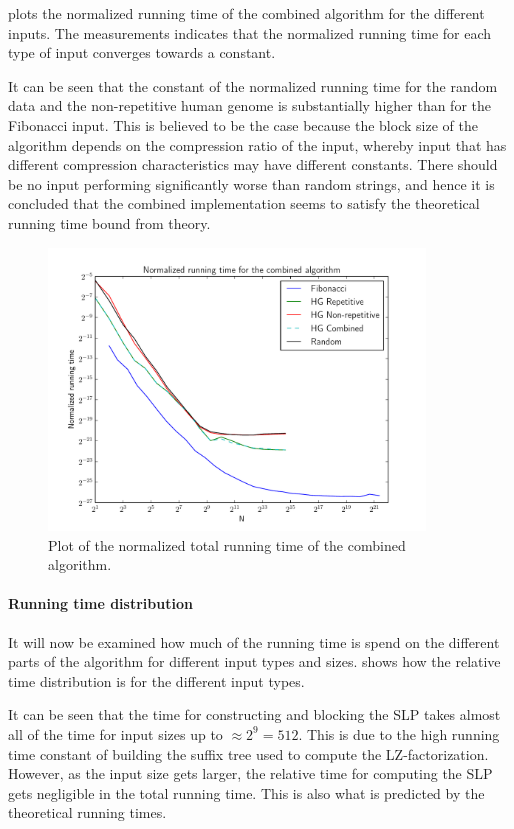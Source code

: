 \documentclass[twoside,11pt,openright]{report}
\begin{document}
 plots the normalized running time of the combined algorithm for the different inputs. The measurements indicates that the normalized running time for each type of input converges towards a constant.

It can be seen that the constant of the normalized running time for the random data and the non-repetitive human genome is substantially higher than for the Fibonacci input. This is believed to be the case because the block size of the algorithm depends on the compression ratio of the input, whereby input that has different compression characteristics may have different constants. There should be no input performing significantly worse than random strings, and hence it is concluded that the combined implementation seems to satisfy the theoretical running time bound from theory.
\begin{figure}[h!]
  \centering
  \includegraphics[width=10cm]{combined/total_runningtime}
  \caption{Plot of the normalized total running time of the combined algorithm.}
  \label{fig:benchmark:total-time-combined}
\end{figure}

\paragraph{Running time distribution}
It will now be examined how much of the running time is spend on the different parts of the algorithm for different input types and sizes.  shows how the relative time distribution is for the different input types.

It can be seen that the time for constructing and blocking the SLP takes almost all of the time for input sizes up to $\approx 2^9 = 512$. This is due to the high running time constant of building the suffix tree used to compute the LZ-factorization. However, as the input size gets larger, the relative time for computing the SLP gets negligible in the total running time. This is also what is predicted by the theoretical running times.
\end{document}
